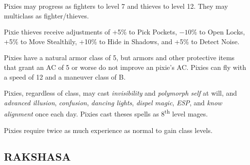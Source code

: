\begin{multicols}{2}
\begin{minipage}{\columnwidth}
\end{minipage}

Pixies may progress as fighters to level 7 and thieves to level 12. They may multiclass as fighter/thieves.

Pixie thieves receive adjustments of +5\% to Pick Pockets, $-10$\% to Open Locks, +5\% to Move Stealthily, +10\% to Hide in Shadows, and +5\% to Detect Noise.

Pixies have a natural armor class of 5, but armors and other protective items that grant an AC of 5 or worse do not improve an pixie's AC. Pixies can fly with a speed of 12 and a maneuver class of B.

Pixies, regardless of class, may cast \textit{invisibility} and \textit{polymorph self} at will, and \textit{advanced illusion}, \textit{confusion}, \textit{dancing lights}, \textit{dispel magic}, \textit{ESP}, and \textit{know alignment} once each day. Pixies cast theses spells as 8\textsuperscript{th} level mages.

Pixies require twice as much experience as normal to gain class levels.

\noindent
\begin{minipage}{\columnwidth}

\vspace{1em}

\subsection{RAKSHASA}


\end{minipage}
\end{multicols}
